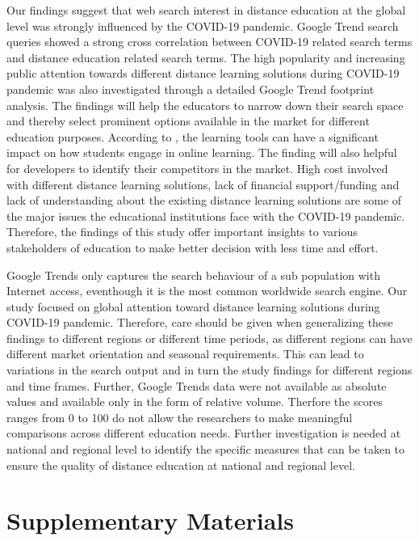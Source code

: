 \documentclass[11pt,a4paper,]{article}
\begin{document}
Our findings suggest that web search interest in distance education at the global level was strongly influenced by the COVID-19 pandemic. Google Trend search queries showed a strong cross correlation between COVID-19 related search terms and distance education related search terms. The high popularity and increasing public attention towards different distance learning solutions during COVID-19 pandemic was also investigated through a detailed Google Trend footprint analysis. The findings will help the educators to narrow down their search space and thereby select prominent options available in the market for different education purposes. According to \textcite{wallace2003online}, the learning tools can have a significant impact on how students engage in online learning. The finding will also helpful for developers to identify their competitors in the market. High cost involved with different distance learning solutions, lack of financial support/funding and lack of understanding about the existing distance learning solutions are some of the major issues the educational institutions face with the COVID-19 pandemic. Therefore, the findings of this study offer important insights to various stakeholders of education to make better decision with less time and effort.

Google Trends only captures the search behaviour of a sub population with Internet access, eventhough it is the most common worldwide search engine. Our study focused on global attention toward distance learning solutions during COVID-19 pandemic. Therefore, care should be given when generalizing these findings to different regions or different time periods, as different regions can have different market orientation and seasonal requirements. This can lead to variations in the search output and in turn the study findings for different regions and time frames. Further, Google Trends data were not available as absolute values and available only in the form of relative volume. Therfore the scores ranges from 0 to 100 do not allow the researchers to make meaningful comparisons across different education needs. Further investigation is needed at national and regional level to identify the specific measures that can be taken to ensure the quality of distance education at national and regional level.

\hypertarget{supplementary-materials}{%
\section*{Supplementary Materials}\label{supplementary-materials}}
\end{document}
